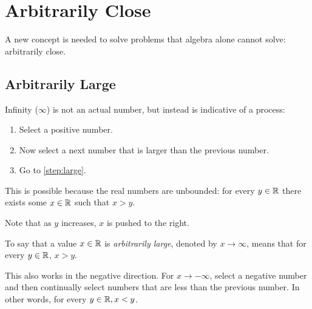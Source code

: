 \documentclass[letterpaper,12pt,fleqn]{article}
\begin{document}
\section*{Arbitrarily Close}

A new concept is needed to solve problems that algebra alone cannot solve: arbitrarily close.

\subsection*{Arbitrarily Large}

Infinity (\(\infty\)) is not an actual number, but instead is indicative of a process:

\begin{enumerate}
\item Select a positive number.
\item\label{step:large} Now select a next number that is larger than the previous number.
\item Go to \ref{step:large}.
\end{enumerate}

This is possible because the real numbers are unbounded: for every \(y\in\mathbb{R}\) there exists some \(x\in\mathbb{R}\) such
that \(x>y\).

\bigskip

\begin{center}
\end{center}

Note that as \(y\) increases, \(x\) is pushed to the right.

\begin{definition}
  To say that a value \(x\in\mathbb{R}\) is \emph{arbitrarily large}, denoted by \(x\to\infty\), means that for every
  \(y\in\mathbb{R}\), \(x>y\).
\end{definition}

This also works in the negative direction.  For \(x\to-\infty\), select a negative number and then continually
select numbers that are less than the previous number.  In other words, for every \(y\in\mathbb{R},x<y\).

\bigskip

\begin{center}
\end{center}
\end{document}
